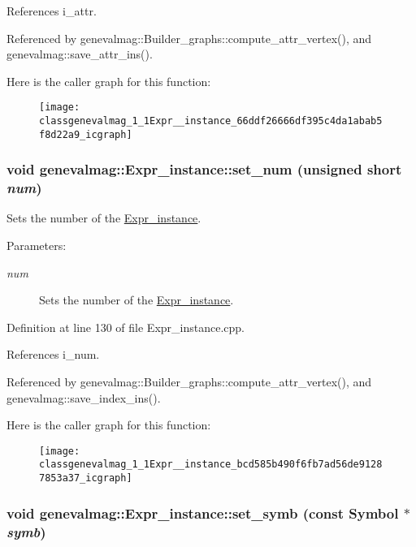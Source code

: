 References i\_\-attr.

Referenced by genevalmag::Builder\_\-graphs::compute\_\-attr\_\-vertex(), and genevalmag::save\_\-attr\_\-ins().

Here is the caller graph for this function:\nopagebreak
\begin{figure}[H]
\begin{center}
\leavevmode
\texttt{[image: classgenevalmag\_1\_1Expr\_\_instance\_66ddf26666df395c4da1abab5f8d22a9\_icgraph]}
\end{center}
\end{figure}
\hypertarget{classgenevalmag_1_1Expr__instance_bcd585b490f6fb7ad56de91287853a37}{
\subsubsection[{set\_\-num}]{\setlength{\rightskip}{0pt plus 5cm}void genevalmag::Expr\_\-instance::set\_\-num (unsigned short {\em num})}}
\label{classgenevalmag_1_1Expr__instance_bcd585b490f6fb7ad56de91287853a37}


Sets the number of the \hyperlink{classgenevalmag_1_1Expr__instance}{Expr\_\-instance}. \begin{Desc}
\item[Parameters:]
\begin{description}
\item[{\em num}]Sets the number of the \hyperlink{classgenevalmag_1_1Expr__instance}{Expr\_\-instance}. \end{description}
\end{Desc}


Definition at line 130 of file Expr\_\-instance.cpp.

References i\_\-num.

Referenced by genevalmag::Builder\_\-graphs::compute\_\-attr\_\-vertex(), and genevalmag::save\_\-index\_\-ins().

Here is the caller graph for this function:\nopagebreak
\begin{figure}[H]
\begin{center}
\leavevmode
\texttt{[image: classgenevalmag\_1\_1Expr\_\_instance\_bcd585b490f6fb7ad56de91287853a37\_icgraph]}
\end{center}
\end{figure}
\hypertarget{classgenevalmag_1_1Expr__instance_b1ba139af4ef942599e8882e7201e1f5}{
\subsubsection[{set\_\-symb}]{\setlength{\rightskip}{0pt plus 5cm}void genevalmag::Expr\_\-instance::set\_\-symb (const {\bf Symbol} $\ast$ {\em symb})}}
\label{classgenevalmag_1_1Expr__instance_b1ba139af4ef942599e8882e7201e1f5}



